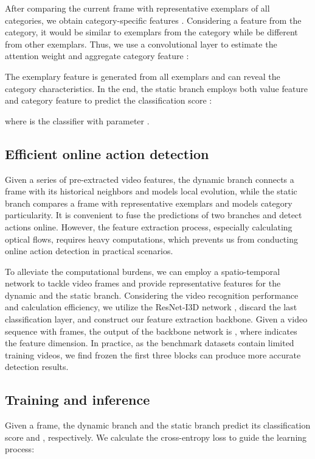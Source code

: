 \documentclass[10pt,twocolumn,letterpaper]{article}
\begin{document}
After comparing the current frame with representative exemplars of all categories, we obtain category-specific features . Considering a feature from the  category, it would be similar to exemplars from the  category while be different from other exemplars. Thus, we use a convolutional layer to estimate the attention weight  and aggregate category feature :


The exemplary feature  is generated from all exemplars and can reveal the category characteristics. In the end, the static branch employs both value feature  and category feature  to predict the classification score :

where  is the classifier with parameter .


\subsection{Efficient online action detection}
Given a series of pre-extracted video features, the dynamic branch connects a frame with its historical neighbors and models local evolution, while the static branch compares a frame with representative exemplars and models category particularity. It is convenient to fuse the predictions of two branches and detect actions online. However, the feature extraction process, especially calculating optical flows, requires heavy computations, which prevents us from conducting online action detection in practical scenarios.

To alleviate the computational burdens, we can employ a spatio-temporal network to tackle video frames and provide representative features for the dynamic and the static branch. Considering the video recognition performance and calculation efficiency, we utilize the ResNet-I3D network \cite{wang2018non}, discard the last classification layer, and construct our feature extraction backbone. Given a video sequence with  frames, the output of the backbone network is , where  indicates the feature dimension. In practice, as the benchmark datasets contain limited training videos, we find frozen the first three blocks can produce more accurate detection results.


\subsection{Training and inference}

Given a frame, the dynamic branch and the static branch predict its classification score  and , respectively. We calculate the cross-entropy loss to guide the learning process:
\end{document}
